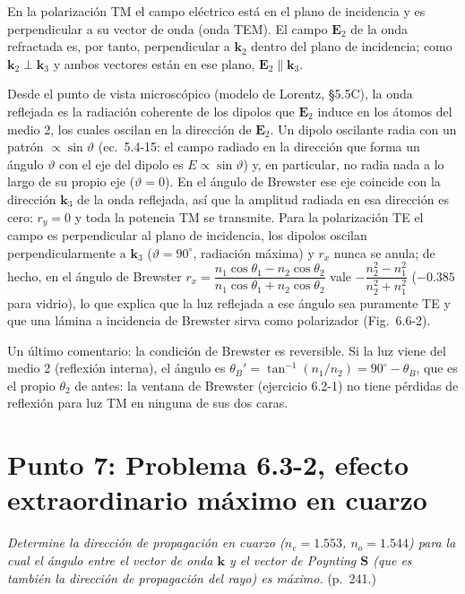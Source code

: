 \documentclass{article}
\newcommand{\kv}{\mathbf{k}}
\newcommand{\Sv}{\mathbf{S}}
\newcommand{\Ev}{\mathbf{E}}
\begin{document}
En la polarización TM el campo eléctrico está en el plano de incidencia y es perpendicular a
su vector de onda (onda TEM). El campo $\Ev_2$ de la onda refractada es, por tanto,
perpendicular a $\kv_2$ dentro del plano de incidencia; como $\kv_2\perp\kv_3$ y ambos
vectores están en ese plano, $\Ev_2\parallel\kv_3$.

Desde el punto de vista microscópico (modelo de Lorentz, §5.5C), la onda reflejada es la
radiación coherente de los dipolos que $\Ev_2$ induce en los átomos del medio 2, los cuales
oscilan en la dirección de $\Ev_2$. Un dipolo oscilante radia con un patrón $\propto\sin\vartheta$
(ec.~5.4-15: el campo radiado en la dirección que forma un ángulo $\vartheta$ con el eje del
dipolo es $E\propto\sin\vartheta$) y, en particular, no radia nada a lo largo de su propio eje
($\vartheta=0$). En el ángulo de Brewster ese eje coincide con la dirección $\kv_3$ de la onda
reflejada, así que la amplitud radiada en esa dirección es cero: $r_y=0$ y toda la potencia TM
se transmite. Para la polarización TE el campo es perpendicular al plano de incidencia, los
dipolos oscilan perpendicularmente a $\kv_3$ ($\vartheta=90^\circ$, radiación máxima) y
$r_x$ nunca se anula; de hecho, en el ángulo de Brewster
$r_x=\dfrac{n_1\cos\theta_1-n_2\cos\theta_2}{n_1\cos\theta_1+n_2\cos\theta_2}$ vale
$-\dfrac{n_2^2-n_1^2}{n_2^2+n_1^2}$ ($-0.385$ para vidrio), lo que explica que la luz reflejada a ese
ángulo sea puramente TE y que una lámina a incidencia de Brewster sirva como polarizador
(Fig.~6.6-2).

Un último comentario: la condición de Brewster es reversible. Si la luz viene del medio 2
(reflexión interna), el ángulo es $\theta_B'=\tan^{-1}(n_1/n_2)=90^\circ-\theta_B$, que es el
propio $\theta_2$ de antes: la ventana de Brewster (ejercicio 6.2-1) no tiene pérdidas de
reflexión para luz TM en ninguna de sus dos caras.

\section{Punto 7: Problema 6.3-2, efecto extraordinario máximo en cuarzo}

\emph{Determine la dirección de propagación en cuarzo ($n_e=1.553$, $n_o=1.544$) para la cual el
ángulo entre el vector de onda $\kv$ y el vector de Poynting $\Sv$ (que es también la dirección
de propagación del rayo) es máximo.} (p.~241.)
\end{document}
